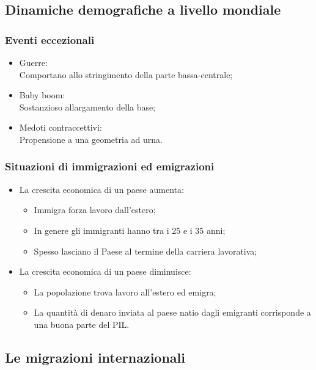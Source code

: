 \documentclass{article}
\begin{document}
\subsection{Dinamiche demografiche a livello mondiale}
\subsubsection{Eventi eccezionali}
\begin{itemize}
    \item Guerre:\\
        Comportano allo stringimento della parte bassa-centrale;
    \item Baby boom:\\
        Sostanzioso allargamento della base;
    \item Medoti contraccettivi:\\
        Propensione a una geometria ad urna.
\end{itemize}

\subsubsection{Situazioni di immigrazioni ed emigrazioni}
\begin{itemize}
    \item La crescita economica di un paese aumenta:
    \begin{itemize}[label=$\circ$]
        \item Immigra forza lavoro dall'estero;
        \item In genere gli immigranti hanno tra i 25 e i 35 anni;
        \item Spesso lasciano il Paese al termine della carriera lavorativa;
    \end{itemize}
    \item La crescita economica di un paese diminuisce:
    \begin{itemize}[label=$\circ$]
        \item La popolazione trova lavoro all'estero ed emigra;
        \item La quantità di denaro inviata al paese natio dagli emigranti corrisponde a una
            buona parte del PIL.
    \end{itemize}
\end{itemize}

\subsection{Le migrazioni internazionali}
\end{document}
